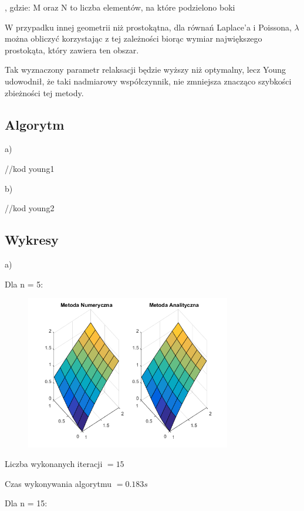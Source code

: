 , gdzie: M oraz N to liczba elementów, na które podzielono boki

W przypadku innej geometrii niż prostokątna, dla równań Laplace'a i Poissona, $\lambda$ można obliczyć korzystając z tej zależności biorąc wymiar największego prostokąta, który zawiera ten obszar.

Tak wyznaczony parametr relaksacji będzie wyższy niż optymalny, lecz Young udowodnił, że taki nadmiarowy współczynnik, nie zmniejsza znacząco szybkości zbieżności tej metody.

\subsection{Algorytm}

a)

//kod young1

b)

//kod young2

\subsection{Wykresy}

a)

Dla n = 5:

\begin{figure}[!ht]
	\begin{center}
		\includegraphics[width=0.8\textwidth]{Lab6/charts/young/zad1/5.png}
	\end{center}
\end{figure}

Liczba wykonanych iteracji $ = 15 $

Czas wykonywania algorytmu $ = 0.183 s$

Dla n = 15:

